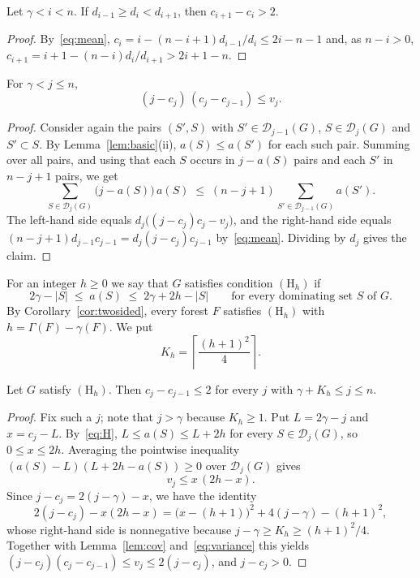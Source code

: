 \documentclass[smallextended,envcountsect,envcountsame]{svjour3}
\newcommand{\Dom}{\mathcal{D}}
\begin{document}
\begin{lemma}\label{lem:valley}
Let $\gamma<i<n$. If $d_{i-1}\ge d_i<d_{i+1}$, then $c_{i+1}-c_i>2$.
\end{lemma}

\begin{proof}
By~\eqref{eq:mean}, $c_i=i-(n-i+1)d_{i-1}/d_i\le 2i-n-1$ and, as $n-i>0$,
$c_{i+1}=i+1-(n-i)d_i/d_{i+1}>2i+1-n$.
\end{proof}

\begin{lemma}\label{lem:cov}
For $\gamma<j\le n$,
\begingroup\small\[
  (j-c_j)\,(c_j-c_{j-1})\le v_j .
\]\endgroup
\end{lemma}

\begin{proof}
Consider again the pairs $(S',S)$ with $S'\in\Dom_{j-1}(G)$,
$S\in\Dom_j(G)$ and $S'\subset S$. By Lemma~\ref{lem:basic}(ii),
$a(S)\le a(S')$ for each such pair. Summing over all pairs, and using that
each $S$ occurs in $j-a(S)$ pairs and each $S'$ in $n-j+1$ pairs, we get
\begingroup\small\[
  \sum_{S\in\Dom_j(G)}\bigl(j-a(S)\bigr)\,a(S)\;\le\;
  (n-j+1)\sum_{S'\in\Dom_{j-1}(G)}a(S') .
\]\endgroup
The left-hand side equals $d_j\bigl((j-c_j)c_j-v_j\bigr)$, and the right-hand
side equals $(n-j+1)d_{j-1}c_{j-1}=d_j(j-c_j)c_{j-1}$ by~\eqref{eq:mean}.
Dividing by $d_j$ gives the claim.
\end{proof}

For an integer $h\ge0$ we say that $G$ satisfies condition $(\mathrm{H}_h)$ if
\begingroup\small\begin{equation}\label{eq:H}
  2\gamma-|S|\;\le\;a(S)\;\le\;2\gamma+2h-|S|
  \qquad\text{for every dominating set $S$ of $G$.}
\end{equation}\endgroup
By Corollary~\ref{cor:twosided}, every forest $F$ satisfies $(\mathrm{H}_h)$
with $h=\Gamma(F)-\gamma(F)$. We put
\begingroup\small\[
  K_h=\left\lceil\frac{(h+1)^2}{4}\right\rceil .
\]\endgroup

\begin{lemma}\label{lem:jump}
Let $G$ satisfy $(\mathrm{H}_h)$. Then $c_j-c_{j-1}\le 2$ for every $j$ with
$\gamma+K_h\le j\le n$.
\end{lemma}

\begin{proof}
Fix such a $j$; note that $j>\gamma$ because $K_h\ge1$. Put $L=2\gamma-j$ and
$x=c_j-L$. By~\eqref{eq:H}, $L\le a(S)\le L+2h$ for every $S\in\Dom_j(G)$, so
$0\le x\le 2h$. Averaging the pointwise inequality
$(a(S)-L)(L+2h-a(S))\ge0$ over $\Dom_j(G)$ gives
\begingroup\small\begin{equation}\label{eq:variance}
  v_j\le x\,(2h-x) .
\end{equation}\endgroup
Since $j-c_j=2(j-\gamma)-x$, we have the identity
\begingroup\small\[
  2(j-c_j)-x(2h-x)=\bigl(x-(h+1)\bigr)^2+4(j-\gamma)-(h+1)^2 ,
\]\endgroup
whose right-hand side is nonnegative because $j-\gamma\ge K_h\ge(h+1)^2/4$.
Together with Lemma~\ref{lem:cov} and~\eqref{eq:variance} this yields
$(j-c_j)(c_j-c_{j-1})\le v_j\le 2(j-c_j)$, and $j-c_j>0$.
\end{proof}
\end{document}
